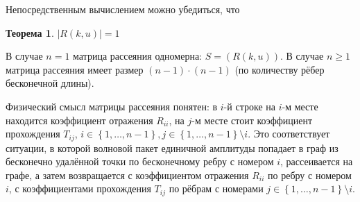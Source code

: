 \documentclass[a4 paper, 12 pt]{extarticle}
\newtheorem{theorem}{Теорема}[section]
\begin{document}
   Непосредственным вычислением можно убедиться, что 
   \begin{theorem}
   	$\left|R\left(k,u\right)\right| = 1$
   \end{theorem}
   
   В случае $n=1$ матрица рассеяния одномерна: $S = \left(R\left(k,u\right)\right)$. 
   В случае $n \geqslant 1$ матрица рассеяния имеет размер $(n-1) \cdot (n-1)$ (по количеству рёбер бесконечной длины).
   
   Физический смысл матрицы рассеяния понятен: в $i$-й строке на $i$-м месте находится коэффициент отражения $R_{ii}$, на $j$-м месте стоит коэффициент прохождения $T_{ij}$, $i \in \left\{1,\ldots,n-1\right\}, j \in \left\{1,\ldots,n-1\right\}\setminus i $.  Это соответствует ситуации, в которой волновой пакет единичной амплитуды попадает в граф из бесконечно удалённой точки по бесконечному ребру с номером $i$, рассеивается на графе, а затем возвращается с коэффициентом отражения $R_{ii}$ по ребру с номером $i$, с коэффициентами прохождения $T_{ij}$ по рёбрам с номерами $j \in \left\{1,\ldots,n-1\right\}\setminus i $.
   
\end{document}
